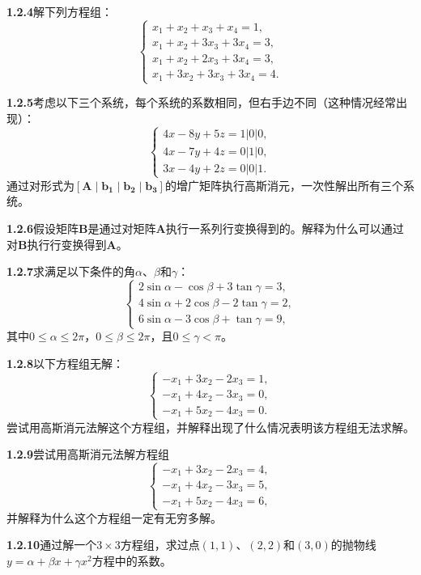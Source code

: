 \textbf{1.2.4}解下列方程组：
\[
\begin{cases}
	x_1 + x_2 + x_3 + x_4 = 1, \\
	x_1 + x_2 + 3x_3 + 3x_4 = 3, \\
	x_1 + x_2 + 2x_3 + 3x_4 = 3, \\
	x_1 + 3x_2 + 3x_3 + 3x_4 = 4.
\end{cases}
\]

\textbf{1.2.5}考虑以下三个系统，每个系统的系数相同，但右手边不同（这种情况经常出现）：
\[
\begin{cases}
	4x - 8y + 5z = 1 \big| 0 \big| 0, \\
	4x - 7y + 4z = 0 \big| 1 \big| 0, \\
	3x - 4y + 2z = 0 \big| 0 \big| 1.
\end{cases}
\]
通过对形式为\( [\mathbf{A} \mid \mathbf{b_1} \mid \mathbf{b_2} \mid \mathbf{b_3}] \)的增广矩阵执行高斯消元，一次性解出所有三个系统。

\textbf{1.2.6}假设矩阵\(\mathbf{B}\)是通过对矩阵\(\mathbf{A}\)执行一系列行变换得到的。解释为什么可以通过对\(\mathbf{B}\)执行行变换得到\(\mathbf{A}\)。

\textbf{1.2.7}求满足以下条件的角\(\alpha\)、\(\beta\)和\(\gamma\)：
\[
\begin{cases}
	2\sin\alpha - \cos\beta + 3\tan\gamma = 3, \\
	4\sin\alpha + 2\cos\beta - 2\tan\gamma = 2, \\
	6\sin\alpha - 3\cos\beta + \tan\gamma = 9,
\end{cases}
\]
其中\(0 \leq \alpha \leq 2\pi\)，\(0 \leq \beta \leq 2\pi\)，且\(0 \leq \gamma < \pi\)。

\textbf{1.2.8}以下方程组无解：
\[
\begin{cases}
	-x_1 + 3x_2 - 2x_3 = 1, \\
	-x_1 + 4x_2 - 3x_3 = 0, \\
	-x_1 + 5x_2 - 4x_3 = 0.
\end{cases}
\]
尝试用高斯消元法解这个方程组，并解释出现了什么情况表明该方程组无法求解。

\textbf{1.2.9}尝试用高斯消元法解方程组
\[
\begin{cases}
	-x_1 + 3x_2 - 2x_3 = 4, \\
	-x_1 + 4x_2 - 3x_3 = 5, \\
	-x_1 + 5x_2 - 4x_3 = 6,
\end{cases}
\]
并解释为什么这个方程组一定有无穷多解。

\textbf{1.2.10}通过解一个\(3 \times 3\)方程组，求过点\((1,1)\)、\((2,2)\)和\((3,0)\)的抛物线\(y = \alpha + \beta x + \gamma x^2\)方程中的系数。

